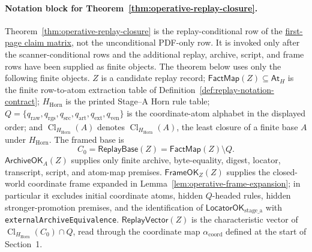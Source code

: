 \documentclass[runningheads]{llncs}
\DeclareRobustCommand{\stageAprose}{Stage--A}
\newcommand{\LocatorOKstageA}{\mathsf{LocatorOK}_{\mathrm{stage\_a}}}
\newcommand{\ArchiveOKA}{\mathsf{ArchiveOK}_{A}}
\newcommand{\FactMap}{\mathsf{FactMap}}
\newcommand{\AtH}{\mathsf{At}_{H}}
\newcommand{\ReplayVector}{\mathsf{ReplayVector}}
\newcommand{\ReplayBase}{\mathsf{ReplayBase}}
\newcommand{\FrameOKZ}{\mathsf{FrameOK}_{Z}}
\newcommand{\rawBeginTokenCoord}{q_{\mathrm{raw}}}
\newcommand{\qlex}{\rawBeginTokenCoord}
\newcommand{\qrgs}{q_{\mathrm{rgs}}}
\newcommand{\qsrc}{q_{\mathrm{src}}}
\newcommand{\qart}{q_{\mathrm{art}}}
\newcommand{\qext}{q_{\mathrm{ext}}}
\newcommand{\qven}{q_{\mathrm{ven}}}
\newcommand{\coordAtom}{\alpha_{\mathrm{coord}}}
\newcommand{\HHorn}{H_{\mathrm{Horn}}}
\newcommand{\ClHHorn}{\operatorname{Cl}_{\HHorn}}
\begin{document}
\paragraph{Notation block for Theorem~\ref{thm:operative-replay-closure}.}
Theorem~\ref{thm:operative-replay-closure} is the replay-conditional row of the
\hyperref[claim-matrix:first-page]{first-page claim matrix}, not the
unconditional PDF-only row.  It is invoked only after the scanner-conditional rows and the
additional replay, archive, script, and frame rows have been supplied as finite
objects.
The theorem below uses only the following finite objects.  \(Z\) is a candidate
replay record; \(\FactMap(Z)\subseteq\AtH\) is the finite row-to-atom extraction
table of Definition~\ref{def:replay-notation-contract}; \(\HHorn\) is the printed
\stageAprose{} Horn rule table; \(Q=\{\qlex,\qrgs,\qsrc,\qart,\qext,\qven\}\)
is the coordinate-atom alphabet in the displayed order; and
\(\ClHHorn(A)\) denotes \(\operatorname{Cl}_{\HHorn}(A)\), the least closure of a
finite base \(A\) under \(\HHorn\).  The framed base is
\[
C_0=\ReplayBase(Z)=\FactMap(Z)\setminus Q .
\]
\(\ArchiveOKA(Z)\) supplies only finite archive, byte-equality, digest,
locator, transcript, script, and atom-map premises.  \(\FrameOKZ(Z)\) supplies
the closed-world coordinate frame expanded in
Lemma~\ref{lem:operative-frame-expansion}; in particular it excludes initial
coordinate atoms, hidden \(Q\)-headed rules, hidden stronger-promotion premises, and the
identification of \(\LocatorOKstageA\) with
\texttt{externalArchiveEquivalence}.  \(\ReplayVector(Z)\) is the characteristic
vector of \(\ClHHorn(C_0)\cap Q\), read through the coordinate map
\(\coordAtom\) defined at the start of Section~1.
\end{document}
